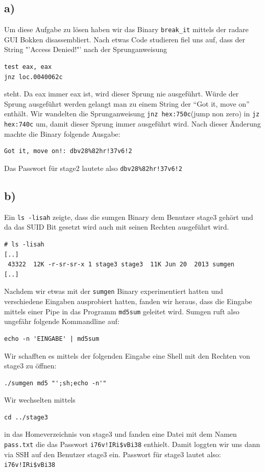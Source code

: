 \documentclass[10pt,a4paper]{article}
\begin{document}
\subsection*{a)}
Um diese Aufgabe zu lösen haben wir das Binary \texttt{break\_it} mittels der radare GUI Bokken disassembliert. Nach etwas Code studieren fiel uns auf, dass der String "'Access Denied!"' nach der Sprunganweisung 
\begin{verbatim}
test eax, eax
jnz loc.0040062c
\end{verbatim}  
steht. Da eax immer eax ist, wird dieser Sprung nie ausgeführt. Würde der Sprung ausgeführt werden gelangt man zu einem String der "`Got it, move on"' enthält. Wir wandelten die Sprunganweisung \texttt{jnz hex:750c}(jump non zero) in \texttt{jz hex:740c} um, damit dieser Sprung immer ausgeführt wird.
Nach dieser Änderung machte die Binary folgende Ausgabe:
\begin{verbatim}
Got it, move on!: dbv28%82hr!37v6!2
\end{verbatim}
Das Passwort für stage2 lautete also \texttt{dbv28\%82hr!37v6!2}

\subsection*{b)}
Ein \texttt{ls -lisah} zeigte, dass die sumgen Binary dem Benutzer stage3 gehört und da das SUID Bit gesetzt wird auch mit seinen Rechten ausgeführt wird.
\begin{verbatim}
# ls -lisah
[..]
 43322  12K -r-sr-sr-x 1 stage3 stage3  11K Jun 20  2013 sumgen
[..]
\end{verbatim}
Nachdem wir etwas mit der \texttt{sumgen} Binary experimentiert hatten und verschiedene Eingaben ausprobiert hatten, fanden wir heraus, dass die Eingabe mittels einer Pipe in das Programm \texttt{md5sum} geleitet wird.
Sumgen ruft also ungefähr folgende Kommandline auf:
\begin{verbatim}
echo -n 'EINGABE' | md5sum 
\end{verbatim}
Wir schafften es mittels der folgenden Eingabe eine Shell mit den Rechten von stage3 zu öffnen:
\begin{verbatim}
./sumgen md5 "';sh;echo -n'"
\end{verbatim}
Wir wechselten mittels 
\begin{verbatim}
cd ../stage3
\end{verbatim}
in das Homeverzeichnis von stage3 und fanden eine Datei mit dem Namen \texttt{pass.txt} die das Passwort \texttt{i76v!IRi\$vBi38} enthielt. Damit loggten wir uns dann via SSH auf den Benutzer stage3 ein.
Passwort für stage3 lautet also: \texttt{i76v!IRi\$vBi38}
\end{document}
